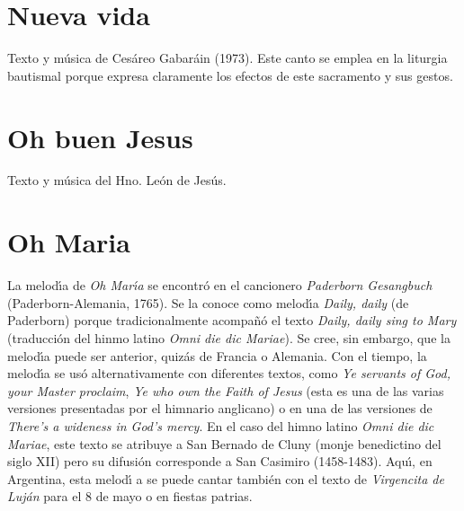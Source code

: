 \documentclass[landscape,12pt]{report}
\begin{document}
\section*{\small Nueva vida} \noindent\footnotesize Texto y m\'usica de Ces\'areo Gabar\'ain (1973). Este canto se emplea en la liturgia bautismal porque expresa claramente los efectos de este sacramento y sus gestos. 
\section*{\small Oh buen Jesus} \noindent\footnotesize Texto y m\'usica del Hno. Le\'on de Jes\'us. 
\section*{\small Oh Maria} \noindent\footnotesize La melod\'\i a de \emph{Oh Mar\'\i a} se encontr\'o en el cancionero \emph{Paderborn Gesangbuch} (Paderborn-Alemania, 1765). Se la conoce como melod\'\i a \emph{Daily, daily} (de Paderborn) porque tradicionalmente acompa\~n\'o el texto \emph{Daily, daily sing to Mary} (traducci\'on del hinmo latino \emph{Omni die dic Mariae}). Se cree, sin embargo, que la melod\'\i a puede ser anterior, quiz\'as de Francia o Alemania. Con el tiempo, la melod\'\i a se us\'o alternativamente con diferentes textos, como \emph{Ye servants of God, your Master proclaim}, \emph{Ye who own the Faith of Jesus} (esta es una de las varias versiones presentadas por el himnario anglicano) o en una de las versiones de \emph{There's a wideness in God's mercy}. En el caso del himno latino \emph{Omni die dic Mariae}, este texto se atribuye a San Bernado de Cluny (monje benedictino del siglo XII) pero su difusi\'on corresponde a San Casimiro (1458-1483). Aqu\'\i , en Argentina, esta melod\'\i 
a se puede cantar tambi\'en con el texto de \textit{Virgencita de Luj\'an} para el 8 de mayo o en fiestas patrias. 
\end{document}
